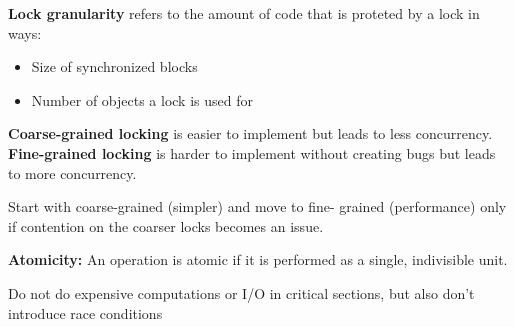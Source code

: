 \begin{definition}
\textbf{Lock granularity } refers to the amount of code that is proteted by a lock in ways:
\begin{itemize}
        \item Size of synchronized blocks
        \item Number of objects a lock is used for
\end{itemize}
\end{definition}

\begin{theorem}
\textbf{Coarse-grained locking} is easier to implement but leads to less concurrency. \textbf{Fine-grained locking} is harder to implement without creating bugs but leads to more concurrency.
\end{theorem}

\begin{important}
Start with coarse-grained (simpler) and move to fine-
grained (performance) only if contention on the coarser locks becomes an issue.
\end{important}

\begin{definition}
\textbf{Atomicity: } An operation is atomic if it is performed as a single, indivisible unit. 
\end{definition}

\begin{important}
    Do not do expensive computations or I/O in critical
    sections, but also don’t introduce race conditions
\end{important}